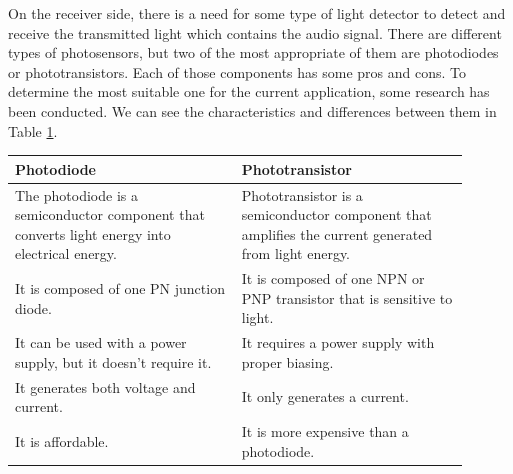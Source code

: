 \documentclass[a4paper,10pt]{IEEEtran}
\begin{document}
On the receiver side, there is a need for some type of light detector to detect and receive the transmitted light which contains the audio signal. There are different types of photosensors, but two of the most appropriate of them are photodiodes or phototransistors. Each of those components has some pros and cons. To determine the most suitable one for the current application, some research has been conducted. We can see the characteristics and differences between them in Table \ref*{table1}. 

\begin{table}[htbp!]
    \begin{tabular}{|p{0.45\linewidth}|p{0.45\linewidth}|}
    \hline
    \textbf{Photodiode}                                                         & \textbf{Phototransistor}                                                                \\ \hline
    The photodiode is a semiconductor component that converts light energy into electrical energy. & Phototransistor is a semiconductor component that amplifies the current generated from light energy. \\ \hline
    It is composed of one PN junction diode.                                                   & It is composed of one NPN or PNP transistor that is sensitive to light.                                \\ \hline
    It can be used with a power supply, but it doesn't require it.                              & It requires a   power supply with proper biasing.                                                        \\ \hline
    It generates both voltage and current.                                                     & It only generates a current.                                                                             \\ \hline
    It is affordable.                                                                            & It is more expensive than a photodiode.                                                                  \\ \hline
    \end{tabular}
    \label{table1}
\end{table}


\end{document}
